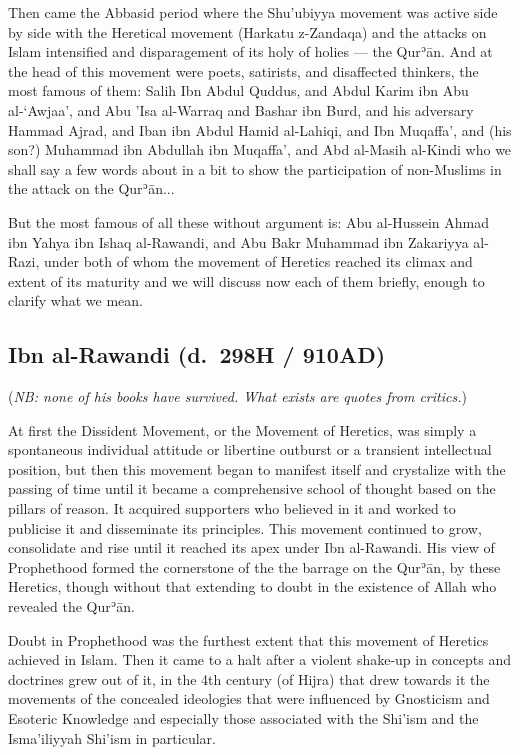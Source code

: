 \documentclass[12pt]{book}
\def \Quran{Qurʾān} %
\newcommand{\NB}[1]{\emph{NB: #1}}
\begin{document}
Then came the Abbasid period where the Shu’ubiyya movement was active side by
side with the Heretical movement (Harkatu z-Zandaqa) and the attacks on Islam
intensified and disparagement of its holy of holies — the \Quran. And at the
head of this movement were poets, satirists, and disaffected thinkers, the most
famous of them: Salih Ibn Abdul Quddus, and Abdul Karim ibn Abu al-‘Awjaa’, and
Abu ’Isa al-Warraq and Bashar ibn Burd, and his adversary Hammad Ajrad, and
Iban ibn Abdul Hamid al-Lahiqi, and Ibn Muqaffa’, and (his son?) Muhammad ibn
Abdullah ibn Muqaffa’, and Abd al-Masih al-Kindi who we shall say a few words
about in a bit to show the participation of non-Muslims in the attack on the
\Quran...

But the most famous of all these without argument is: Abu al-Hussein Ahmad ibn
Yahya ibn Ishaq al-Rawandi, and Abu Bakr Muhammad ibn Zakariyya al-Razi, under
both of whom the movement of Heretics reached its climax and extent of its
maturity and we will discuss now each of them briefly, enough to clarify what
we mean.


\subsection{Ibn al-Rawandi (d.\ 298H / 910AD)}

(\NB{none of his books have survived. What exists are quotes from critics.})

At first the Dissident Movement, or the Movement of Heretics, was simply a
spontaneous individual attitude or libertine outburst or a transient
intellectual position, but then this movement began to manifest itself and
crystalize with the passing of time until it became a comprehensive school of
thought based on the pillars of reason. It acquired supporters who believed in
it and worked to publicise it and disseminate its principles. This movement
continued to grow, consolidate and rise until it reached its apex under Ibn
al-Rawandi. His view of Prophethood formed the cornerstone of the the barrage
on the \Quran, by these Heretics, though without that extending to doubt in the
existence of Allah who revealed the \Quran.

Doubt in Prophethood was the furthest extent that this movement of Heretics
achieved in Islam. Then it came to a halt after a violent shake-up in concepts
and doctrines grew out of it, in the 4th century (of Hijra) that drew towards
it the movements of the concealed ideologies that were influenced by Gnosticism
and Esoteric Knowledge and especially those associated with the Shi’ism and the
Isma’iliyyah Shi’ism in particular.
\end{document}
